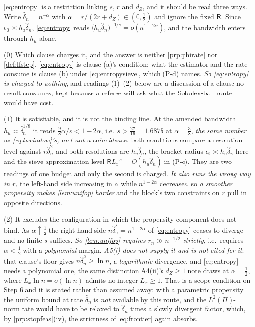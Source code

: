 \begin{remark}\label{rem:l19cost}
\eqref{eq:entropy} is a restriction linking $s$, $r$ and $d_Z$, and it should be read three ways. Write
$\hat\delta_n=n^{-\alpha}$ with $\alpha=r/(2r+d_Z)\in(0,\tfrac12)$ and ignore the fixed $\mathsf R$.
Since $\epsilon_0\asymp h_u\hat\delta_n$, \eqref{eq:entropy} reads
$\big(h_u\hat\delta_n\big)^{-1/s}=o(n^{1-2\alpha})$, and the bandwidth enters through $h_u$ alone.

(0) Which clause charges it, and the answer is neither \cref{prp:phirate} nor
\cref{def:lfstep}. \eqref{eq:entropy} is clause (a)'s condition; what the estimator and the rate
consume is clause (b) under \eqref{eq:entropysieve}, which (P-d) names. \emph{So \eqref{eq:entropy} is
charged to nothing}, and readings (1)--(2) below are a discussion of a clause no result consumes, kept
because a referee will ask what the Sobolev-ball route would have cost.

(1) It is satisfiable, and it is not the binding line. At
the amended bandwidth $h_u\asymp\hat\delta_n^{1/8}$ it
reads $\tfrac98\alpha/s<1-2\alpha$, i.e.\ $s>\tfrac{27}{16}=1.6875$ at $\alpha=\tfrac38$, 
\emph{the same number as \eqref{eq:lxwindow}'s, and not a coincidence}: both
conditions compare a resolution level against $n\hat\delta_n^{2}$ and both resolutions are
$h_u\hat\delta_n$, the bracket radius $\epsilon_0\asymp h_u\hat\delta_n$ here and the sieve
approximation level $\mathsf RL_x^{-s}=O(h_u\hat\delta_n)$ in (P-c). They are two readings of one
budget and only the second is charged. \emph{It also runs the wrong way in $r$}, the left-hand side
increasing in $\alpha$ while $n^{1-2\alpha}$ decreases, so \emph{a smoother propensity makes
\cref{lem:unifop} harder} and the block's two constraints on $r$ pull in opposite directions.

(2) It excludes the configuration in which the propensity component does not bind. As
$\alpha\uparrow\tfrac12$ the right-hand side $n\hat\delta_n^{2}=n^{1-2\alpha}$ of \eqref{eq:entropy}
ceases to diverge and no finite $s$
suffices. \emph{So \cref{lem:unifop} requires $r_n\gg n^{-1/2}$ strictly}, i.e.\ requires
$\alpha<\tfrac12$ with a \emph{polynomial} margin. \emph{A5(i) does not supply it and is not cited for
it}: that clause's floor gives $n\hat\delta_n^{2}\ge\ln n$, a \emph{logarithmic} divergence, and
\eqref{eq:entropy} needs a polynomial one, the same distinction A4(ii)'s $d_Z\ge1$ note draws at
$\alpha=\tfrac12$, where $L_x\ln n=o(\ln n)$ admits no integer $L_x\ge1$.
That is a scope condition on Step 6 and it is stated rather than assumed away: with a parametric
propensity the uniform bound at rate $\hat\delta_n$ is \emph{not} available by this route, and the
$L^{2}(\Pi)$-norm rate would have to be relaxed to $\hat\delta_n$ times a slowly divergent factor, 
which, by \cref{prp:stopfeas}(iv), the strictness of \eqref{eq:frontier} again absorbs.
\end{remark}

